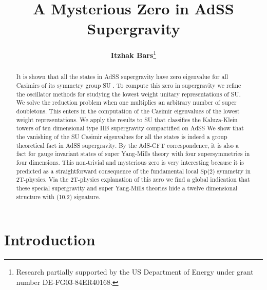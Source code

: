 \documentclass[a4paper,aps,preprint,nofootinbib]{revtex4}
\begin{document}
\bigskip


\title{{\Large A Mysterious Zero in AdS\coordHE{}S\coordHE{} Supergravity }}\bigskip

\author{\textbf{{\large {Itzhak Bars}}}{\footnote{
Research partially supported by the US Department of Energy under
grant number DE-FG03-84ER40168.}}}

\address{\large{Department of Physics and Astronomy\\
 University of Southern California,
Los Angeles, CA 90089-0484}} %

\begin{abstract}
It is shown that all the states in AdS\coordHE{}S\coordHE{}
supergravity have zero eigenvalue for all Casimirs of its symmetry
group SU\coordHE{} . To compute this zero in supergravity we
refine the oscillator methods for studying the lowest weight
unitary representations of SU\coordHE{}. We solve the reduction
problem when one multiplies an arbitrary number of super
doubletons. This enters in the computation of the Casimir
eigenvalues of the lowest weight representations. We apply the results to SU\coordHE{} that classifies the Kaluza-Klein towers of ten
dimensional type IIB supergravity compactified on
AdS\coordHE{}S\coordHE{} We show that the vanishing of the
SU\coordHE{} Casimir eigenvalues for all the states is indeed a
group theoretical fact in AdS\coordHE{}S\coordHE{} supergravity. By
the AdS-CFT correspondence, it is also a fact for gauge invariant
states of super Yang-Mills theory with four supersymmetries in
four dimensions. This non-trivial and mysterious zero is very
interesting because it is predicted as a straightforward
consequence of the fundamental local Sp(2) symmetry in 2T-physics.
Via the 2T-physics explanation of this zero we find a global
indication that these special supergravity and super Yang-Mills
theories hide a twelve dimensional structure with (10,2)
signature.
\end{abstract}

\maketitle

\section{Introduction}
\end{document}
